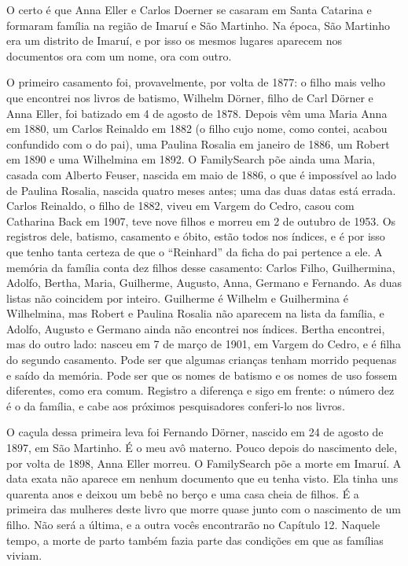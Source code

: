 \documentclass[
  brazilian,
  11pt,
  openany]{book}
\begin{document}
O certo é que Anna Eller e Carlos Doerner se casaram em Santa Catarina e
formaram família na região de Imaruí e São Martinho. Na época, São
Martinho era um distrito de Imaruí, e por isso os mesmos lugares
aparecem nos documentos ora com um nome, ora com outro.

O primeiro casamento foi, provavelmente, por volta de 1877: o filho mais
velho que encontrei nos livros de batismo, Wilhelm Dörner, filho de Carl
Dörner e Anna Eller, foi batizado em 4 de agosto de 1878. Depois vêm uma
Maria Anna em 1880, um Carlos Reinaldo em 1882 (o filho cujo nome, como
contei, acabou confundido com o do pai), uma Paulina Rosalia em janeiro
de 1886, um Robert em 1890 e uma Wilhelmina em 1892. O FamilySearch põe
ainda uma Maria, casada com Alberto Feuser, nascida em maio de 1886, o
que é impossível ao lado de Paulina Rosalia, nascida quatro meses antes;
uma das duas datas está errada. Carlos Reinaldo, o filho de 1882, viveu
em Vargem do Cedro, casou com Catharina Back em 1907, teve nove filhos e
morreu em 2 de outubro de 1953. Os registros dele, batismo, casamento e
óbito, estão todos nos índices, e é por isso que tenho tanta certeza de
que o ``Reinhard'' da ficha do pai pertence a ele. A memória da família
conta dez filhos desse casamento: Carlos Filho, Guilhermina, Adolfo,
Bertha, Maria, Guilherme, Augusto, Anna, Germano e Fernando. As duas
listas não coincidem por inteiro. Guilherme é Wilhelm e Guilhermina é
Wilhelmina, mas Robert e Paulina Rosalia não aparecem na lista da
família, e Adolfo, Augusto e Germano ainda não encontrei nos índices.
Bertha encontrei, mas do outro lado: nasceu em 7 de março de 1901, em
Vargem do Cedro, e é filha do segundo casamento. Pode ser que algumas
crianças tenham morrido pequenas e saído da memória. Pode ser que os
nomes de batismo e os nomes de uso fossem diferentes, como era comum.
Registro a diferença e sigo em frente: o número dez é o da família, e
cabe aos próximos pesquisadores conferi-lo nos livros.

O caçula dessa primeira leva foi Fernando Dörner, nascido em 24 de
agosto de 1897, em São Martinho. É o meu avô materno. Pouco depois do
nascimento dele, por volta de 1898, Anna Eller morreu. O FamilySearch
põe a morte em Imaruí. A data exata não aparece em nenhum documento que
eu tenha visto. Ela tinha uns quarenta anos e deixou um bebê no berço e
uma casa cheia de filhos. É a primeira das mulheres deste livro que
morre quase junto com o nascimento de um filho. Não será a última, e a
outra vocês encontrarão no Capítulo 12. Naquele tempo, a morte de parto
também fazia parte das condições em que as famílias viviam.
\end{document}
